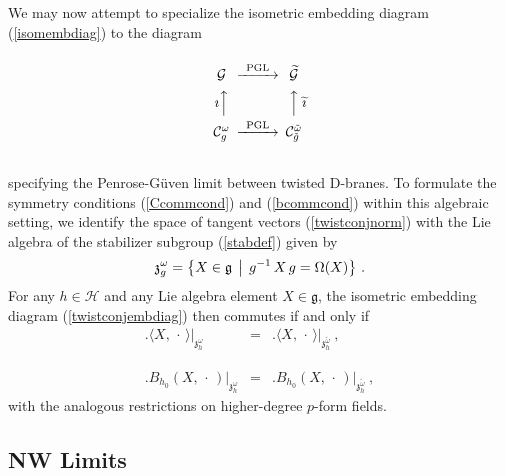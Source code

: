 \documentclass[11pt,a4paper]{article}
\def\nn{\nonumber}
\def\bea{\begin{eqnarray}}
\def\eea{\end{eqnarray}}
\newcommand{\beq}{\begin{eqnarray}}
\newcommand{\eeq}{\end{eqnarray}}
\begin{document}
We may now attempt to specialize the isometric embedding diagram
(\ref{isomembdiag}) to the diagram
\begin{equation}
  \begin{CD}
    @.\\
    \mathcal{G} @>\text{PGL}>>                      \widetilde{\mathcal{G}}\\
    \text{$\imath$}@AAA @AAA\text{$\widetilde{\imath}$}\\
    \mathcal{C}_g^\omega @>\text{PGL}>> \mathcal{C}_{\tilde g}^{\tilde\omega}\\
    @.
  \end{CD}
\label{twistconjembdiag}\end{equation}
specifying the Penrose-G\"uven limit between twisted D-branes. To
formulate the symmetry conditions (\ref{Ccommcond}) and
(\ref{bcommcond}) within this algebraic setting, we identify the
space of tangent vectors (\ref{twistconjnorm}) with the Lie algebra of
the stabilizer subgroup (\ref{stabdef}) given by
\beq
\mathfrak{z}_g^\omega=\bigl\{X\in\mathfrak{g}\,\bigm|\,g^{-1}\,X\,g=
\Omega(X)\bigr\} \ .
\label{stabLiealg}\eeq
For any $h\in\mathcal{H}$ and any Lie algebra element
$X\in\mathfrak{g}$, the isometric embedding diagram
(\ref{twistconjembdiag}) then commutes if and only if
\bea
\bigl.\langle X,\,\cdot\,\rangle\bigr|_{\mathfrak{z}_h^\omega}&=&
\bigl.\langle X,\,\cdot\,\rangle\bigr|_{\mathfrak{z}_h^{\tilde\omega}}
\ , \label{innprodtwistcomm}\\{~~~~}_{~~}^{~~}\nn\\\bigl.B_{h_0}(X,\,\cdot\,)\bigr|_{
\mathfrak{z}_h^\omega}&=&\bigl.B_{h_0}(X,\,\cdot\,)\bigr|_{
\mathfrak{z}_h^{\tilde\omega}} \ ,
\label{Bfieldtwistcomm}\eea
with the analogous restrictions on higher-degree $p$-form fields.

\subsection{NW Limits\label{ApplNW}}
\end{document}
